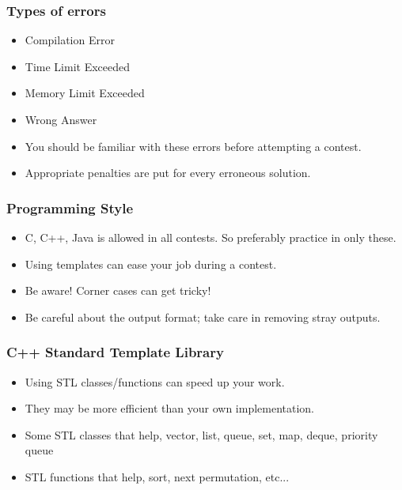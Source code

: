\documentclass{beamer}
\begin{document}

\begin{frame}
\frametitle{Types of errors}
\begin{itemize}
\item Compilation Error
\item Time Limit Exceeded
\item Memory Limit Exceeded
\item Wrong Answer
\item You should be familiar with these errors before attempting a contest.
\item Appropriate penalties are put for every erroneous solution.
\end{itemize}
\end{frame}



\begin{frame}
\frametitle{Programming Style}
\begin{itemize}
\item C, C++, Java is allowed in all contests. So preferably practice
in only these.
\item Using templates can ease your job during a contest.
\item Be aware! Corner cases can get tricky!
\item Be careful about the output format; take care in removing
stray outputs.
\end{itemize}
\end{frame}



\begin{frame}
\frametitle{C++ Standard Template Library}
\begin{itemize}
\item Using STL classes/functions can speed up your work.
\item They may be more efficient than your own implementation.
\item Some STL classes that help, \newline
vector, list, queue, set, map, deque, priority queue
\item STL functions that help, \newline
sort, next permutation, etc...
\end{itemize}
\end{frame}
\end{document}
